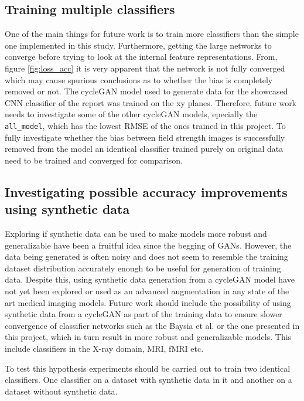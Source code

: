 \documentclass[12pt, fleqn, titlepage]{article}
\newcommand{\1}[1]{\mathds{1}\left[#1\right]}
\begin{document}
\subsection{Training multiple classifiers}\label{future_work_mult}


One of the main things for future work is to train more classifiers than the simple one implemented in this study. Furthermore, getting the large networks to converge before trying to look at the internal feature representations. From, figure \ref{fig:loss_acc} it is very apparent that the network is not fully converged which may cause spurious conclusions as to whether the bias is completely removed or not. The cycleGAN model used to generate data for the showcased CNN classifier of the report was trained on the xy planes. Therefore, future work needs to investigate some of the other cycleGAN models, epecially the \texttt{all\_model}, which has the lowest RMSE of the ones trained in this project. To fully investigate whether the bias between field strength images is successfully removed from the model an identical classifier trained purely on original data need to be trained and converged for comparison.

\subsection{Investigating possible accuracy improvements using synthetic data}

Exploring if synthetic data can be used to make models more robust and generalizable have been a fruitful idea since the begging of GANs. However, the data being generated is often  noisy and does not seem to resemble the training dataset distribution accurately enough to be useful for generation of training data. Despite this, using synthetic data generation from a cycleGAN model have not yet been explored or used as an advanced augmentation in any state of the art medical imaging models. %
Future work should include the possibility of using synthetic data from a cycleGAN as part of the training data to ensure slower convergence of classifier networks such as the Baysia et al. or the one presented in this project, which in turn result in more robust and generalizable models. This include classifiers in the X-ray domain, MRI, fMRI etc.

To test this hypothesis experiments should be carried out to train two identical classifiers. One classifier on a dataset with synthetic data in it and another on a dataset without synthetic data. 
\end{document}
